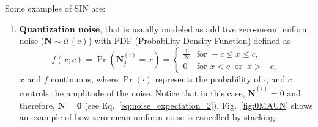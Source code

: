 \documentclass{article}
\begin{document}
Some examples of SIN are:
\begin{enumerate}
\item \textbf{Quantization noise}, that is usually modeled as additive
  zero-mean uniform noise (${\mathbf N}\sim{\mathcal U}(c)$) with PDF
  (Probability Density Function) defined as
  \begin{equation}
    f(x; c) = \Pr({\mathbf N}^{(i)}_j{=}x) = \begin{cases}
      \frac{1}{2c} & \text{for } -c \le x \le c, \\[8pt]
      0 & \text{for } x < c \ \text{ or } \ x > -c,
    \end{cases}
  \end{equation}
  $x$ and $f$ continuous, where $\Pr(\cdot)$ represents the
  probability of $\cdot$, and $c$ controls the amplitude of the
  noise. Notice that in this case, $\overline{\mathbf{N}}^{(i)}=0$ and
  therefore, $\overline{\mathbf N}={\mathbf 0}$ (see
  Eq.~\ref{eq:noise_expectation_2}). Fig.~\ref{fig:0MAUN} shows an
  example of how zero-mean uniform noise is cancelled by stacking.
  

\end{enumerate}
\end{document}
